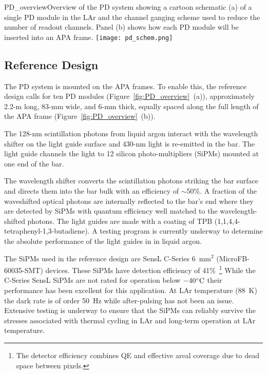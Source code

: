 \begin{cdrfigure}[PD Overview]{PD_overview}{Overview of the PD
    system showing a cartoon schematic (a) of a single PD module
    in the LAr and the channel ganging scheme used to reduce the
    number of readout channels. Panel (b) shows how each PD module
    will be inserted into an APA frame. }
\texttt{[image: pd\_schem.png]}
\end{cdrfigure}

\subsection{Reference Design}
\label{sec:detectors-fd-ref-pd-refsystem}   %

The PD system is mounted on the APA frames. 
To enable this, the reference design %
calls for
ten PD modules (Figure~\ref{fig:PD_overview}~(a)), approximately 2.2-m long, 83-mm wide, and 6-mm thick,
equally spaced along the full length of the APA frame
(Figure~\ref{fig:PD_overview}~(b)). 

The 128-nm scintillation photons from liquid argon interact with the
wavelength shifter on the light guide surface and 430-nm light is
re-emitted in the bar. The light guide channels the light to
12 silicon photo-multipliers (SiPMs) mounted at one end of the bar.

The wavelength shifter converts the scintillation photons striking the
bar surface and directs them into the bar bulk with an efficiency of
$\sim$50\%.  A fraction of the waveshifted optical photons are
internally reflected to the bar's end where they are detected by SiPMs
with quantum efficiency well matched to the wavelength-shifted
photons. The light guides are made with a coating of TPB
(1,1,4,4-tetraphenyl-1,3-butadiene). A testing program is currently
underway to determine the absolute performance of the light guides in
in liquid argon.

The SiPMs used in the reference design are SensL C-Series 6~mm$^2$
(MicroFB-60035-SMT) devices. These SiPMs have detection efficiency of
41\%~\footnote{The detector efficiency combines QE and effective areal
  coverage due to dead space between pixels.} While the C-Series SensL
SiPMs are not rated for operation below $-40^{\circ}{\rm C}$ their
performance has been excellent for this application. At LAr
temperature (88~K)  the dark rate is of order 50~Hz while after-pulsing
has not been an issue. Extensive testing is underway to ensure that
the SiPMs can reliably survive the stresses associated with thermal
cycling in LAr and long-term operation at LAr temperature.

